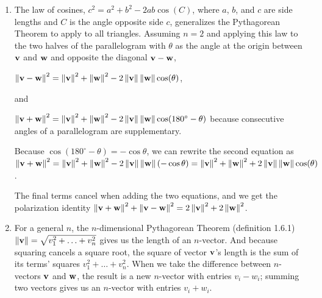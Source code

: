 \begin{solution}
\begin{enumerate}
  \item
  	\begin{answer}
	
	The law of cosines, $c^2 = a^2 + b^2 - 2ab\cos (C)$, where $a$, $b$, and $c$ are side lengths and $C$ is the angle opposite side $c$, generalizes the Pythagorean Theorem to apply to all triangles. Assuming $n = 2$ and applying this law to the two halves of the parallelogram with $\theta$ as the angle at the origin between $\mathbf{v}$ and $\mathbf{w}$ and opposite the diagonal $\mathbf{v} - \mathbf{w}$,
	
	\vspace{\baselineskip}
	$\left\lVert \mathbf{v} - \mathbf{w} \right\rVert^2 = 
	\left\lVert \mathbf{v} \right\rVert^2 + \left\lVert \mathbf{w} \right\rVert^2 - 2\left\lVert \mathbf{v} \right\rVert\left\lVert \mathbf{w} \right\rVert\cos (\theta)$,
	
	\vspace{\baselineskip}
	and
	
	\vspace{\baselineskip}
	$\left\lVert \mathbf{v} + \mathbf{w} \right\rVert^2 = 
	\left\lVert \mathbf{v} \right\rVert^2 + \left\lVert \mathbf{w} \right\rVert^2 - 2\left\lVert \mathbf{v} \right\rVert\left\lVert \mathbf{w} \right\rVert\cos (180^\circ - \theta)$
	because consecutive angles of a parallelogram are supplementary. 

	\vspace{\baselineskip}	
	Because $\cos (180^\circ - \theta) = -\cos \theta$, we can rewrite the second equation as
	$\left\lVert \mathbf{v} + \mathbf{w} \right\rVert^2 = 
	\left\lVert \mathbf{v} \right\rVert^2 + \left\lVert \mathbf{w} \right\rVert^2 - 2\left\lVert \mathbf{v} \right\rVert\left\lVert \mathbf{w} \right\rVert(-\cos\theta) = \left\lVert \mathbf{v} \right\rVert^2 + \left\lVert \mathbf{w} \right\rVert^2 + 2\left\lVert \mathbf{v} \right\rVert\left\lVert \mathbf{w} \right\rVert\cos (\theta)$.
	
	\vspace{\baselineskip}
	The final terms cancel when adding the two equations, and we get the polarization identity
	$\left\lVert \mathbf{v} + \mathbf{w} \right\rVert^2 + \left\lVert \mathbf{v} - \mathbf{w} \right\rVert^2 = 2\left\lVert \mathbf{v} \right\rVert^2 + 2\left\lVert \mathbf{w} \right\rVert^2$.
  
  	\end{answer}
  
  \item
    \begin{answer}
    
   For a general $n$,  the $n$-dimensional Pythagorean Theorem (definition 1.6.1) $\left\lVert \mathbf{v} \right\rVert = \sqrt{v_1^2 + \hdots + v_n^2}$ gives us the length of an $n$-vector. And because squaring cancels a square root, the square of vector $\mathbf{v}$'s length is the sum of its terms' squares $v_1^2 + \hdots + v_n^2$. When we take the difference between $n$-vectors $\mathbf{v}$ and $\mathbf{w}$, the result is a new $n$-vector with entries $v_i - w_i$; summing two vectors gives us an $n$-vector with entries $v_i + w_i$.
   

\end{answer}
\end{enumerate}
\end{solution}
